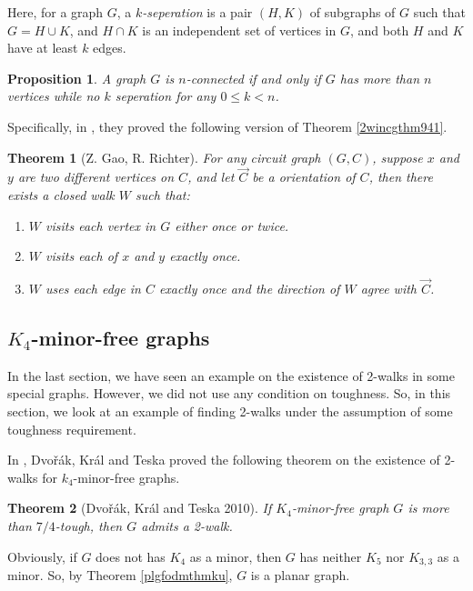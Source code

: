 \documentclass[12pt]{report}
\newtheorem{theorem}{Theorem}
\newtheorem{proposition}{Proposition}
\begin{document}
Here, for a graph $G$, a {\em $k$-seperation} is a pair $(H,K)$ of subgraphs of $G$ such that $G=H\cup K$, and $H\cap K$ is an independent set of vertices in $G$, and both $H$ and $K$ have at least $k$ edges.
\begin{proposition}
A graph $G$ is $n$-connected if and only if $G$ has more than $n$ vertices while no $k$ seperation for any $0\le k<n$.
\end{proposition}

Specifically, in \cite{gao19942}, they proved the following version of Theorem \ref{2wincgthm941}.

\begin{theorem}[Z. Gao, R. Richter]\label{2wincgde942}
For any circuit graph $(G,C)$, suppose $x$ and $y$ are two different vertices on $C$, and let $\vec{C}$ be a orientation of $C$, then there exists a closed walk $W$ such that:
\begin{enumerate}
\item $W$ visits each vertex in $G$ either once or twice.
\item $W$ visits each of $x$ and $y$ exactly once.
\item $W$ uses each edge in $C$ exactly once and the direction of $W$ agree with $\vec{C}$.
\end{enumerate}
\end{theorem}









\subsection{$K_4$-minor-free graphs}
In the last section, we have seen an example on the existence of 2-walks in some special graphs. However, we did not use any condition on toughness. So, in this section, we look at an example of finding 2-walks under the assumption of some toughness requirement.

In \cite{dvovrak2010toughness}, Dvo{\v r}{\'a}k, Kr{\'a}l and Teska proved the following theorem on the existence of 2-walks for $k_4$-minor-free graphs.
\begin{theorem}[Dvo{\v r}{\'a}k, Kr{\'a}l and Teska 2010]\label{thmk4mfg2w}
If $K_4$-minor-free graph $G$ is more than $7/4$-tough, then $G$ admits a 2-walk.
\end{theorem}

Obviously, if $G$ does not has $K_4$ as a minor, then $G$ has neither $K_5$ nor $K_{3,3}$ as a minor. So, by Theorem \ref{plgfodmthmku}, $G$ is a planar graph.
\end{document}
